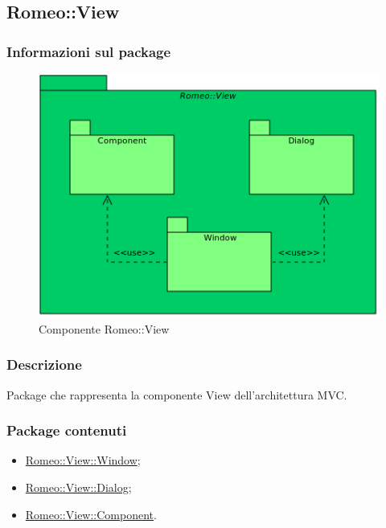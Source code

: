 	\pagebreak
	\subsection{Romeo::View}
	\label{romeo::view}
		\subsubsection{Informazioni sul package}
		\label{view_info}
		\begin{figure}[!h]
			\centering
			\includegraphics[width=\linewidth]{./Content/Immagini/Romeo__View.png}
			\caption{Componente Romeo::View}
			\label{comp_romeo::view}
		\end{figure}
		\subsubsection{Descrizione}
		\label{view_descr}
		Package\glossario{} che rappresenta la componente View dell'architettura MVC\glossario{}.
		\subsubsection{Package contenuti}
		\label{view_package}
		\begin{itemize}
			\item \hyperref[romeo::view::window]{Romeo::View::Window};
			\item \hyperref[romeo::view::dialog]{Romeo::View::Dialog};
			\item \hyperref[romeo::view::component]{Romeo::View::Component}.
		\end{itemize}		
